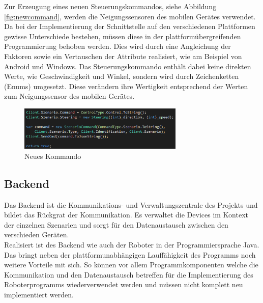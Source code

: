 \noindent
Zur Erzeugung eines neuen Steuerungskommandos, siehe Abbildung \eqref{fig:newcommand}, werden die Neigungssensoren des mobilen Gerätes verwendet. Da bei der Implementierung der Schnittstelle auf den verschiedenen Plattformen gewisse Unterschiede bestehen, müssen diese in der plattformübergreifenden Programmierung behoben werden. Dies wird durch eine Angleichung der Faktoren sowie ein Vertauschen der Attribute realisiert, wie am Beispiel von Android und Windows. Das Steuerungskommando enthält dabei keine direkten Werte, wie Geschwindigkeit und Winkel, sondern wird durch Zeichenketten (Enums) umgesetzt. Diese verändern ihre Wertigkeit entsprechend der Werten zum Neigungssensor des mobilen Gerätes.

\begin{figure}[h]
	\begin{center}
		\includegraphics[width=0.7\textwidth]{images/implementation/newcommand.png}
	\end{center}	
	\caption{Neues Kommando}
	\label{fig:newcommand}
\end{figure}

\newpage
\subsection{Backend}
Das Backend ist die Kommunikations- und Verwaltungszentrale des Projekts und bildet das Rückgrat der Kommunikation. Es verwaltet die 
Devices im Kontext der einzelnen Szenarien und sorgt für den Datenaustausch zwischen den verschieden Geräten. \\
Realisiert ist des Backend wie auch der Roboter in der Programmiersprache Java. Das bringt neben der plattformunabhängigen 
Lauffähigkeit des Programms noch weitere Vorteile mit sich. So können vor allem Programmkomponenten welche die Kommunikation und
den Datenaustausch betreffen für die Implementierung des Roboterprogramms wiederverwendet werden und müssen nicht komplett neu
implementiert werden.
